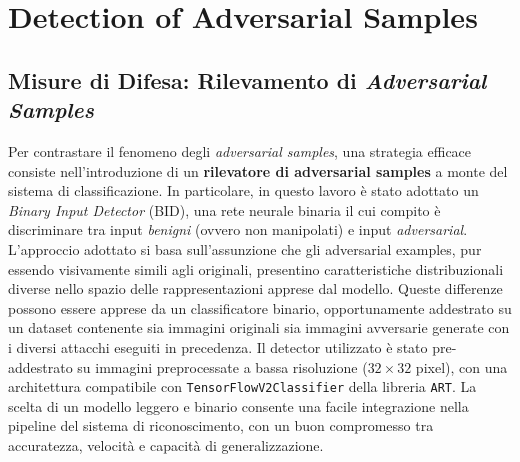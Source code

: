 \chapter{Detection of Adversarial Samples}
    \section{Misure di Difesa: Rilevamento di \textit{Adversarial Samples}}
        Per contrastare il fenomeno degli \textit{adversarial samples}, una strategia efficace consiste nell’introduzione di un \textbf{rilevatore di adversarial samples} a monte del sistema di classificazione. In particolare, in questo lavoro è stato adottato un \textit{Binary Input Detector} (BID), una rete neurale binaria il cui compito è discriminare tra input \textit{benigni} (ovvero non manipolati) e input \textit{adversarial}.
        L’approccio adottato si basa sull’assunzione che gli adversarial examples, pur essendo visivamente simili agli originali, presentino caratteristiche distribuzionali diverse nello spazio delle rappresentazioni apprese dal modello. Queste differenze possono essere apprese da un classificatore binario, opportunamente addestrato su un dataset contenente sia immagini originali sia immagini avversarie generate con i diversi attacchi eseguiti in precedenza.
        Il detector utilizzato è stato pre-addestrato su immagini preprocessate a bassa risoluzione ($32\times32$ pixel), con una architettura compatibile con \texttt{TensorFlowV2Classifier} della libreria \texttt{ART}. La scelta di un modello leggero e binario consente una facile integrazione nella pipeline del sistema di riconoscimento, con un buon compromesso tra accuratezza, velocità e capacità di generalizzazione.

